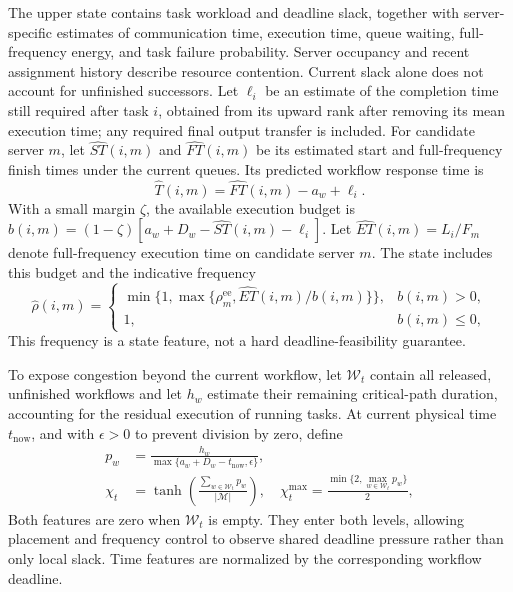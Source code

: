 \documentclass[10pt,twocolumn]{article}
\begin{document}
The upper state contains task workload and deadline slack, together with
server-specific estimates of communication time, execution time, queue
waiting, full-frequency energy, and task failure probability. Server
occupancy and recent assignment history describe resource contention.
Current slack alone does not account for unfinished successors. Let
$\ell_i$ be an estimate of the completion time still required after task
$i$, obtained from its upward rank after removing its mean execution
time; any required final output transfer is included. For candidate
server $m$, let $\widehat{ST}(i,m)$ and $\widehat{FT}(i,m)$ be its
estimated start and full-frequency finish times under the current queues.
Its predicted workflow response time is
\begin{equation}
 \widehat T(i,m)=\widehat{FT}(i,m)-a_w+\ell_i.
 \label{eq:method_predicted_finish}
\end{equation}
With a small margin $\zeta$, the available execution budget is
$b(i,m)=(1-\zeta)[a_w+D_w-\widehat{ST}(i,m)-\ell_i]$.
Let $\widehat{ET}(i,m)=L_i/F_m$ denote full-frequency execution time on candidate
server $m$. The state includes this budget and the indicative frequency
\begin{equation}
 \widehat\rho(i,m)=
 \begin{cases}
 \min\{1,\max\{\rho_m^{\mathrm{ee}},\widehat{ET}(i,m)/b(i,m)\}\},&b(i,m)>0,\\
 1,&b(i,m)\leq0,
 \end{cases}
 \label{eq:method_time_frequency}
\end{equation}
This frequency is a state feature, not a hard deadline-feasibility
guarantee.

To expose congestion beyond the current workflow, let $\mathcal W_t$
contain all released, unfinished workflows and let $h_w$ estimate their
remaining critical-path duration, accounting for the residual execution
of running tasks. At current physical time $t_{\mathrm{now}}$, and with
$\epsilon>0$ to prevent division by zero, define
\begin{align}
 p_w&=\frac{h_w}{\max\{a_w+D_w-t_{\mathrm{now}},\epsilon\}},\nonumber\\
 \chi_t&=\tanh\!\left(\frac{\sum_{w\in\mathcal W_t}p_w}{|\mathcal M|}\right),\quad
 \chi_t^{\max}=\frac{\min\{2,\max_{w\in\mathcal W_t}p_w\}}{2},
 \label{eq:method_global_pressure}
\end{align}
Both features are zero when $\mathcal W_t$ is empty. They enter both levels,
allowing placement and frequency control to observe shared deadline
pressure rather than only local slack. Time features are normalized by
the corresponding workflow deadline.
\end{document}

